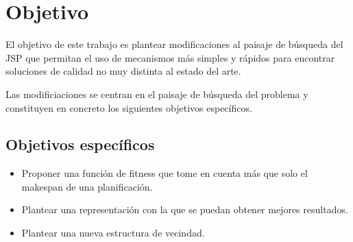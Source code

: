 \section{Objetivo}

El objetivo de este trabajo es plantear modificaciones al paisaje de búsqueda del JSP que permitan el uso de mecanismos más simples y rápidos para encontrar soluciones de calidad no muy distinta al estado del arte. 

Las modificiaciones se centran en el paisaje de búsqueda del problema y constituyen en concreto los siguientes objetivos específicos.


\subsection*{Objetivos específicos}
\begin{itemize}
\item Proponer una función de fitness que tome en cuenta más que solo el makespan de una planificación.
\item Plantear una representación con la que se puedan obtener mejores resultados.
\item Plantear una nueva estructura de vecindad.
\end{itemize}

